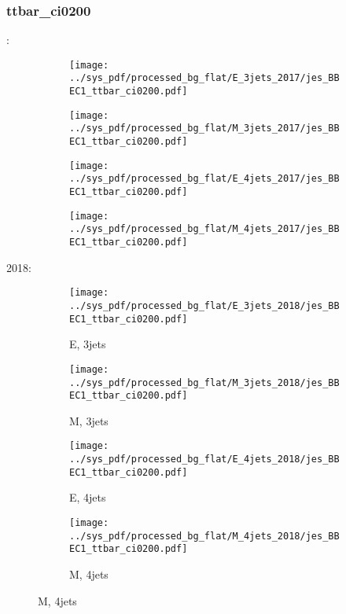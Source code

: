 \documentclass{beamer}
\begin{document}
\begin{frame}
\frametitle{ttbar_ci0200}
\fontsize{5}{1}:
\begin{figure}
\centering
\begin{subfigure}[b]{0.24\textwidth}
\texttt{[image: ../sys\_pdf/processed\_bg\_flat/E\_3jets\_2017/jes\_BBEC1\_ttbar\_ci0200.pdf]}
\end{subfigure}
\begin{subfigure}[b]{0.24\textwidth}
\texttt{[image: ../sys\_pdf/processed\_bg\_flat/M\_3jets\_2017/jes\_BBEC1\_ttbar\_ci0200.pdf]}
\end{subfigure}
\begin{subfigure}[b]{0.24\textwidth}
\texttt{[image: ../sys\_pdf/processed\_bg\_flat/E\_4jets\_2017/jes\_BBEC1\_ttbar\_ci0200.pdf]}
\end{subfigure}
\begin{subfigure}[b]{0.24\textwidth}
\texttt{[image: ../sys\_pdf/processed\_bg\_flat/M\_4jets\_2017/jes\_BBEC1\_ttbar\_ci0200.pdf]}
\end{subfigure}
\end{figure}
2018:
\begin{figure}
\centering
\begin{subfigure}[b]{0.24\textwidth}
\texttt{[image: ../sys\_pdf/processed\_bg\_flat/E\_3jets\_2018/jes\_BBEC1\_ttbar\_ci0200.pdf]}
\captionsetup{font=tiny}
\caption{E, 3jets}
\end{subfigure}
\begin{subfigure}[b]{0.24\textwidth}
\texttt{[image: ../sys\_pdf/processed\_bg\_flat/M\_3jets\_2018/jes\_BBEC1\_ttbar\_ci0200.pdf]}
\captionsetup{font=tiny}
\caption{M, 3jets}
\end{subfigure}
\begin{subfigure}[b]{0.24\textwidth}
\texttt{[image: ../sys\_pdf/processed\_bg\_flat/E\_4jets\_2018/jes\_BBEC1\_ttbar\_ci0200.pdf]}
\captionsetup{font=tiny}
\caption{E, 4jets}
\end{subfigure}
\begin{subfigure}[b]{0.24\textwidth}
\texttt{[image: ../sys\_pdf/processed\_bg\_flat/M\_4jets\_2018/jes\_BBEC1\_ttbar\_ci0200.pdf]}
\captionsetup{font=tiny}
\caption{M, 4jets}
\end{subfigure}
\end{figure}
\end{frame}
\end{document}
